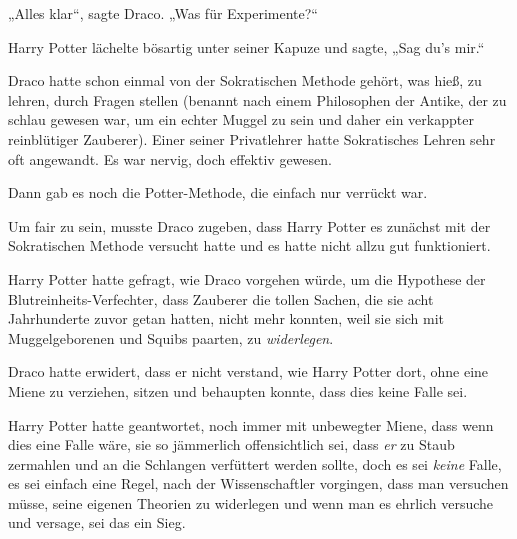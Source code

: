 „Alles klar“, sagte Draco.
„Was für Experimente?“

Harry Potter lächelte bösartig unter seiner Kapuze und sagte,
„Sag du’s mir.“

\later

Draco hatte schon einmal von der Sokratischen Methode gehört, was hieß, zu lehren, durch Fragen stellen (benannt nach einem Philosophen der Antike, der zu schlau gewesen war, um ein echter Muggel zu sein und daher ein verkappter reinblütiger Zauberer). Einer seiner Privatlehrer hatte Sokratisches Lehren sehr oft angewandt. Es war nervig, doch effektiv gewesen.

Dann gab es noch die Potter-Methode, die einfach nur verrückt war.

Um fair zu sein, musste Draco zugeben, dass Harry Potter es zunächst mit der Sokratischen Methode versucht hatte und es hatte nicht allzu gut funktioniert.

Harry Potter hatte gefragt, wie Draco vorgehen würde, um die Hypothese der Blutreinheits-Verfechter, dass Zauberer die tollen Sachen, die sie acht Jahrhunderte zuvor getan hatten, nicht mehr konnten, weil sie sich mit Muggelgeborenen und Squibs paarten, zu \emph{widerlegen}.

Draco hatte erwidert, dass er nicht verstand, wie Harry Potter dort, ohne eine Miene zu verziehen, sitzen und behaupten konnte, dass dies keine Falle sei.

Harry Potter hatte geantwortet, noch immer mit unbewegter Miene, dass wenn dies eine Falle wäre, sie so jämmerlich offensichtlich sei, dass \emph{er} zu Staub zermahlen und an die Schlangen verfüttert werden sollte, doch es sei \emph{keine} Falle, es sei einfach eine Regel, nach der Wissenschaftler vorgingen, dass man versuchen müsse, seine eigenen Theorien zu widerlegen und wenn man es ehrlich versuche und versage, sei das ein Sieg.

